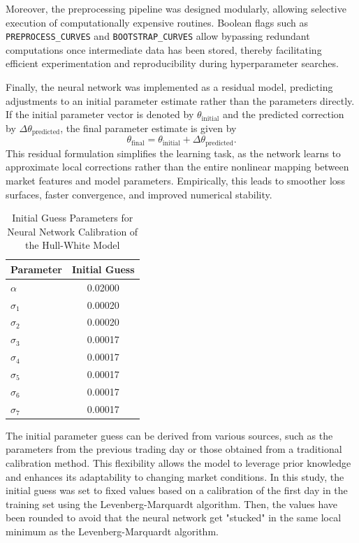 {Moreover, the preprocessing pipeline was designed modularly, allowing selective execution of computationally expensive routines. Boolean flags such as \texttt{PREPROCESS\_CURVES} and \texttt{BOOTSTRAP\_CURVES} allow bypassing redundant computations once intermediate data has been stored, thereby facilitating efficient experimentation and reproducibility during hyperparameter searches.

Finally, the neural network was implemented as a residual model, predicting adjustments to an initial parameter estimate rather than the parameters directly. If the initial parameter vector is denoted by $\theta_{\text{initial}}$ and the predicted correction by $\Delta \theta_{\text{predicted}}$, the final parameter estimate is given by
\begin{equation}
	\theta_{\text{final}} = \theta_{\text{initial}} + \Delta \theta_{\text{predicted}}.
\end{equation}
This residual formulation simplifies the learning task, as the network learns to approximate local corrections rather than the entire nonlinear mapping between market features and model parameters. Empirically, this leads to smoother loss surfaces, faster convergence, and improved numerical stability.

\begin{table}[H]
	\centering
	\begin{threeparttable}
		\caption{Initial Guess Parameters for Neural Network Calibration of the Hull-White Model}
		\label{tab:hw_initial_guess}
		\begin{tabular}{l c}
			\hline
			Parameter  & Initial Guess \\
			\hline
			$\alpha$   & 0.02000       \\
			$\sigma_1$ & 0.00020       \\
			$\sigma_2$ & 0.00020       \\
			$\sigma_3$ & 0.00017       \\
			$\sigma_4$ & 0.00017       \\
			$\sigma_5$ & 0.00017       \\
			$\sigma_6$ & 0.00017       \\
			$\sigma_7$ & 0.00017       \\
			\hline
		\end{tabular}
	\end{threeparttable}
\end{table}

The initial parameter guess can be derived from various sources, such as the parameters from the previous trading day or those obtained from a traditional calibration method. This flexibility allows the model to leverage prior knowledge and enhances its adaptability to changing market conditions. In this study, the initial guess was set to fixed values based on a calibration of the first day in the training set using the Levenberg-Marquardt algorithm. Then, the values have been rounded to avoid that the neural network get "stucked" in the same local minimum as the Levenberg-Marquardt algorithm.

}
